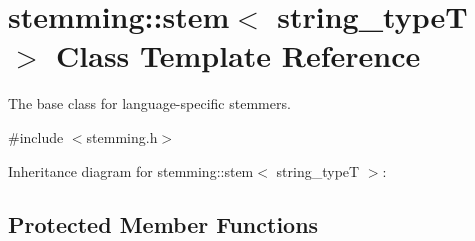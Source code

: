 \section{stemming\+:\+:stem$<$ string\+\_\+typeT $>$ Class Template Reference}
\label{classstemming_1_1stem}


The base class for language-\/specific stemmers.  




{\ttfamily \#include $<$stemming.\+h$>$}



Inheritance diagram for stemming\+:\+:stem$<$ string\+\_\+typeT $>$\+:
\subsection*{Protected Member Functions}
